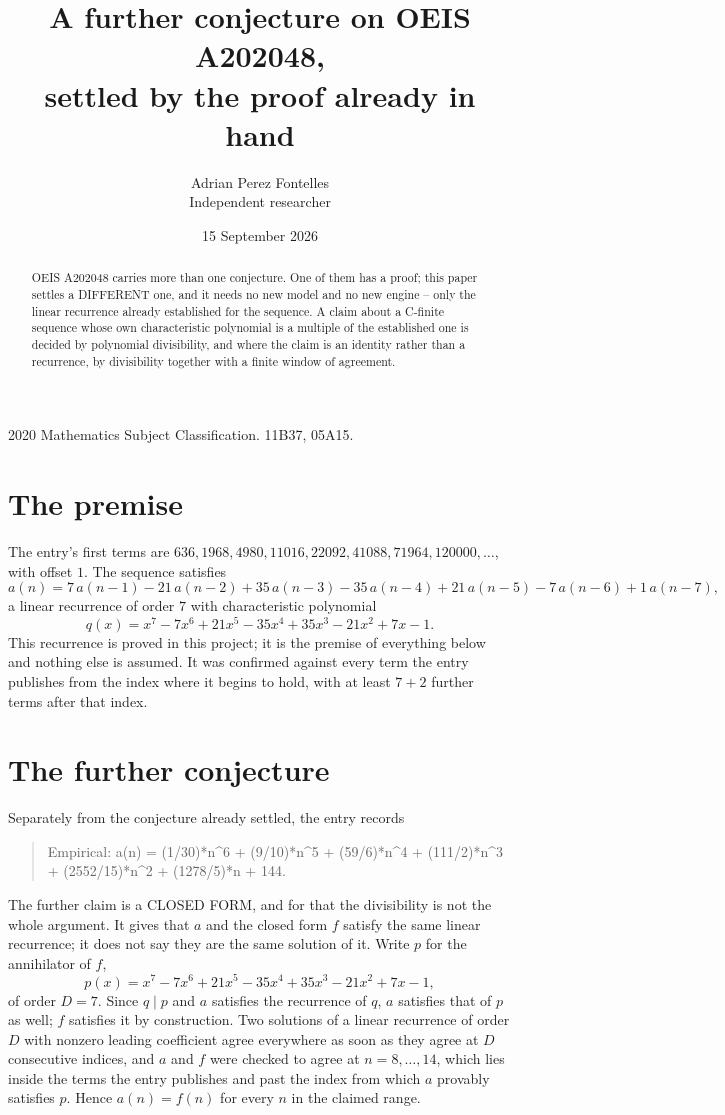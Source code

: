 \documentclass[11pt,a4paper]{article}
\title{A further conjecture on OEIS A202048,\\ \large settled by the proof already in hand}
\author{Adrian Perez Fontelles\\ \small Independent researcher}
\date{15 September 2026}
\theoremstyle{plain}
\theoremstyle{definition}
\begin{document}
\maketitle

\begin{abstract}
OEIS A202048 carries more than one conjecture. One of them has a proof; this paper settles a
DIFFERENT one, and it needs no new model and no new engine -- only the linear recurrence already
established for the sequence. A claim about a C-finite sequence whose own characteristic
polynomial is a multiple of the established one is decided by polynomial divisibility, and where
the claim is an identity rather than a recurrence, by divisibility together with a finite window
of agreement.
\end{abstract}

\noindent\small 2020 Mathematics Subject Classification. 11B37, 05A15.\normalsize

\section{The premise}

The entry's first terms are $636, 1968, 4980, 11016, 22092, 41088, 71964, 120000,\dots$, with offset $1$. The sequence satisfies
\[
  a(n)=7\,a(n-1) - 21\,a(n-2) + 35\,a(n-3) - 35\,a(n-4) + 21\,a(n-5) - 7\,a(n-6) + 1\,a(n-7) ,
\]
a linear recurrence of order $7$ with characteristic polynomial
\[
  q(x)=x^{7} - 7 x^{6} + 21 x^{5} - 35 x^{4} + 35 x^{3} - 21 x^{2} + 7 x - 1 .
\]
This recurrence is proved in this project; it is the premise of everything below and nothing else is assumed.
It was confirmed against every term the entry publishes from the index where it begins to hold,
with at least $7+2$ further terms after that index.

\section{The further conjecture}

Separately from the conjecture already settled, the entry records

\begin{quote}\raggedright Empirical: a(n) = (1/30)*n\^{}6 + (9/10)*n\^{}5 + (59/6)*n\^{}4 + (111/2)*n\^{}3 + (2552/15)*n\^{}2 + (1278/5)*n + 144.\end{quote}

The further claim is a CLOSED FORM, and for that the divisibility is not the whole argument. It
gives that $a$ and the closed form $f$ satisfy the same linear recurrence; it does not say they
are the same solution of it. Write $p$ for the annihilator of $f$,
\[
  p(x)=x^{7} - 7 x^{6} + 21 x^{5} - 35 x^{4} + 35 x^{3} - 21 x^{2} + 7 x - 1 ,
\]
of order $D=7$. Since $q\mid p$ and $a$ satisfies the recurrence of $q$, $a$ satisfies that of
$p$ as well; $f$ satisfies it by construction. Two solutions of a linear recurrence of order $D$
with nonzero leading coefficient agree everywhere as soon as they agree at $D$ consecutive
indices, and $a$ and $f$ were checked to agree at $n=8,\dots,14$,
which lies inside the terms the entry publishes and past the index from which $a$ provably
satisfies $p$. Hence $a(n)=f(n)$ for every $n$ in the claimed range.
\end{document}
